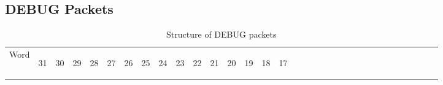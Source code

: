 \documentclass[11pt]{article}
\begin{document}
\subsection{DEBUG Packets}
\begin{table}[h!]
    \centering
    \label{tab:debugDef}
    \caption{Structure of DEBUG packets}
    \begin{tabular}{|p{1cm}|p{0.04cm}|p{0.04cm}|m{0.04cm}|m{0.04cm}|m{0.04cm}|m{0.04cm}|m{0.04cm}|m{0.04cm}|m{0.04cm}|
        m{0.04cm}|m{0.04cm}|m{0.04cm}|m{0.04cm}|m{0.04cm}|m{0.04cm}|m{0.04cm}|m{0.04cm}|m{0.04cm}|m{0.04cm}|m{0.04cm}|
        m{0.04cm}|m{0.04cm}|m{0.04cm}|m{0.04cm}|m{0.04cm}|m{0.04cm}|m{0.04cm}|m{0.04cm}|m{0.04cm}|m{0.04cm}|m{0.04cm}|m{0.04cm}|}
        \hline
        Word & 
        \begin{sideways}31\end{sideways} &
        \begin{sideways}30\end{sideways} & 
        \begin{sideways}29\end{sideways} &
        \begin{sideways}28\end{sideways} &
        \begin{sideways}27\end{sideways} &
        \begin{sideways}26\end{sideways} &
        \begin{sideways}25\end{sideways} &
        \begin{sideways}24\end{sideways} &
        \begin{sideways}23\end{sideways} &
        \begin{sideways}22\end{sideways} &
        \begin{sideways}21\end{sideways} &
        \begin{sideways}20\end{sideways} &
        \begin{sideways}19\end{sideways} &
        \begin{sideways}18\end{sideways} &
        \begin{sideways}17\end{sideways} &

\end{tabular}
\end{table}
\end{document}
